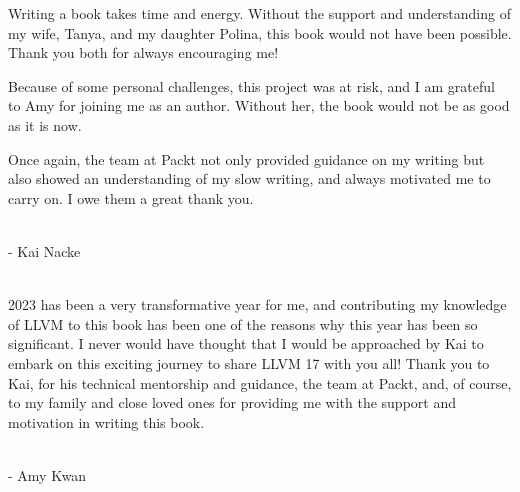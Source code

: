 \begin{center}

Writing a book takes time and energy. Without the support and understanding of my wife, Tanya, and my daughter Polina, this book would not have been possible. Thank you both for always encouraging me! 

Because of some personal challenges, this project was at risk, and I am grateful to Amy for joining me as an author. Without her, the book would not be as good as it is now.

Once again, the team at Packt not only provided guidance on my writing but also showed an understanding of my slow writing, and always motivated me to carry on. I owe them a great thank you.

\hspace*{\fill} \\

- Kai Nacke 

\hspace*{\fill} \\

2023 has been a very transformative year for me, and contributing my knowledge of LLVM to this book has been one of the reasons why this year has been so significant. I never would have thought that I would be approached by Kai to embark on this exciting journey to share LLVM 17 with you all! Thank you to Kai, for his technical mentorship and guidance, the team at Packt, and, of course, to my family and close loved ones for providing me with the support and motivation in writing this book.

\hspace*{\fill} \\

- Amy Kwan

\end{center}